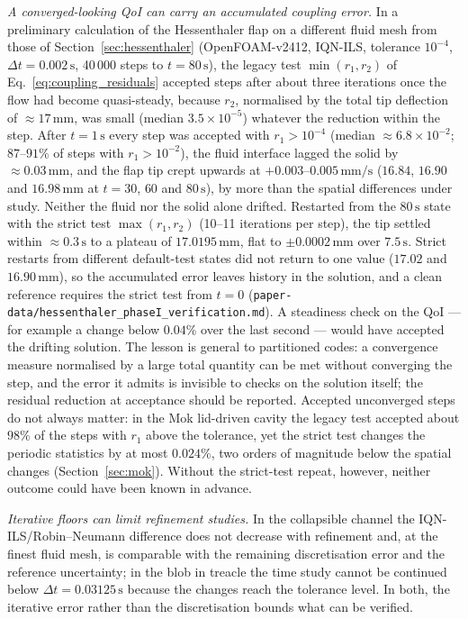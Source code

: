 \emph{A converged-looking QoI can carry an accumulated coupling error.}
In a preliminary calculation of the Hessenthaler flap on a different fluid mesh from those of Section~\ref{sec:hessenthaler} (OpenFOAM-v2412, IQN-ILS, tolerance $10^{-4}$, $\Delta t = 0.002\,\mathrm{s}$, 40\,000 steps to $t = 80\,\mathrm{s}$), the legacy test $\min(r_1, r_2)$ of Eq.~\eqref{eq:coupling_residuals} accepted steps after about three iterations once the flow had become quasi-steady, because $r_2$, normalised by the total tip deflection of $\approx17\,\mathrm{mm}$, was small (median $3.5\times10^{-5}$) whatever the reduction within the step.
After $t = 1\,\mathrm{s}$ every step was accepted with $r_1 > 10^{-4}$ (median $\approx6.8\times10^{-2}$; $87$--$91\%$ of steps with $r_1 > 10^{-2}$), the fluid interface lagged the solid by $\approx0.03\,\mathrm{mm}$, and the flap tip crept upwards at $+0.003$--$0.005\,\mathrm{mm/s}$ ($16.84$, $16.90$ and $16.98\,\mathrm{mm}$ at $t = 30$, $60$ and $80\,\mathrm{s}$), by more than the spatial differences under study.
Neither the fluid nor the solid alone drifted.
Restarted from the $80\,\mathrm{s}$ state with the strict test $\max(r_1, r_2)$ (10--11 iterations per step), the tip settled within $\approx0.3\,\mathrm{s}$ to a plateau of $17.0195\,\mathrm{mm}$, flat to $\pm0.0002\,\mathrm{mm}$ over $7.5\,\mathrm{s}$.
Strict restarts from different default-test states did not return to one value ($17.02$ and $16.90\,\mathrm{mm}$), so the accumulated error leaves history in the solution, and a clean reference requires the strict test from $t = 0$ (\texttt{paper-data/hessenthaler\_phaseI\_verification.md}).
A steadiness check on the QoI --- for example a change below $0.04\%$ over the last second --- would have accepted the drifting solution.
The lesson is general to partitioned codes: a convergence measure normalised by a large total quantity can be met without converging the step, and the error it admits is invisible to checks on the solution itself; the residual reduction at acceptance should be reported.
Accepted unconverged steps do not always matter: in the Mok lid-driven cavity the legacy test accepted about $98\%$ of the steps with $r_1$ above the tolerance, yet the strict test changes the periodic statistics by at most $0.024\%$, two orders of magnitude below the spatial changes (Section~\ref{sec:mok}). Without the strict-test repeat, however, neither outcome could have been known in advance.


\emph{Iterative floors can limit refinement studies.}
In the collapsible channel the IQN-ILS/Robin--Neumann difference does not decrease with refinement and, at the finest fluid mesh, is comparable with the remaining discretisation error and the reference uncertainty; in the blob in treacle the time study cannot be continued below $\Delta t = 0.03125\,\mathrm{s}$ because the changes reach the tolerance level.
In both, the iterative error rather than the discretisation bounds what can be verified.

